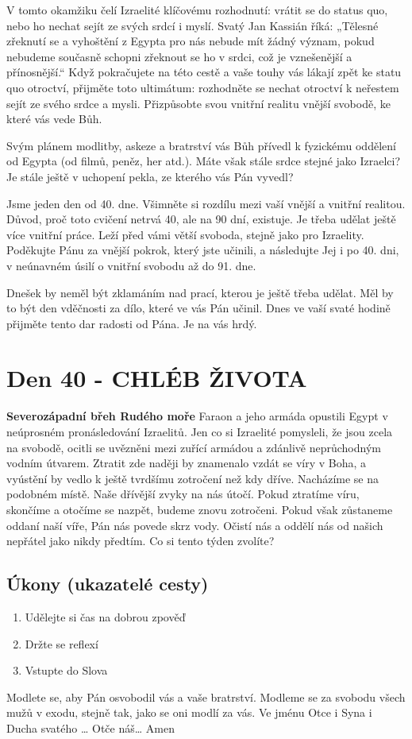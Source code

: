 \documentclass[11pt]{article}
\newcommand{\zacatekSestyTyden}{
  \textbf{Severozápadní břeh Rudého moře} \newline 
  Faraon a jeho armáda opustili Egypt v neúprosném pronásledování Izraelitů. Jen co si Izraelité pomysleli, že jsou zcela na svobodě, ocitli se uvězněni mezi zuřící armádou a zdánlivě neprůchodným vodním útvarem. Ztratit zde naději by znamenalo vzdát se víry v Boha, a vyústění by vedlo k ještě tvrdšímu zotročení než kdy dříve. Nacházíme se na podobném místě. Naše dřívější zvyky na nás útočí. Pokud ztratíme víru, skončíme a otočíme se nazpět, budeme znovu zotročeni. Pokud však zůstaneme oddaní naší víře, Pán nás povede skrz vody. Očistí nás a oddělí nás od našich nepřátel jako nikdy předtím. Co si tento týden zvolíte?

\subsection*{Úkony (ukazatelé cesty)}
\begin{enumerate}
  \item Udělejte si čas na dobrou zpověď
  \item Držte se reflexí
  \item Vstupte do Slova
\end{enumerate}
Modlete se, aby Pán osvobodil vás a vaše bratrství. \newline
Modleme se za svobodu všech mužů v exodu, stejně tak, jako se oni modlí za vás.\newline
Ve jménu Otce i Syna i Ducha svatého …  Otče náš… Amen
}
\begin{document}
V tomto okamžiku čelí Izraelité klíčovému rozhodnutí: vrátit se do status quo, nebo ho nechat sejít ze svých srdcí i
myslí. Svatý Jan Kassián říká: „Tělesné zřeknutí se a vyhoštění z Egypta pro nás nebude mít žádný význam, pokud
nebudeme současně schopni zřeknout se ho v srdci, což je vznešenější a přínosnější.“ Když pokračujete na této cestě a
vaše touhy vás lákají zpět ke statu quo otroctví, přijměte toto ultimátum: rozhodněte se nechat otroctví k neřestem sejít
ze svého srdce a mysli. Přizpůsobte svou vnitřní realitu vnější svobodě, ke které vás vede Bůh.

Svým plánem modlitby, askeze a bratrství vás Bůh přívedl k fyzickému oddělení od Egypta (od filmů, peněz, her atd.).
Máte však stále srdce stejné jako Izraelci? Je stále ještě v uchopení pekla, ze kterého vás Pán vyvedl?

Jsme jeden den od 40. dne. Všimněte si rozdílu mezi vaší vnější a vnitřní realitou. Důvod, proč toto cvičení netrvá 40,
ale na 90 dní, existuje. Je třeba udělat ještě více vnitřní práce. Leží před vámi větší svoboda, stejně jako pro Izraelity.
Poděkujte Pánu za vnější pokrok, který jste učinili, a následujte Jej i po 40. dni, v neúnavném úsilí o vnitřní svobodu až
do 91. dne.

Dnešek by neměl být zklamáním nad prací, kterou je ještě třeba udělat. Měl by to být den vděčnosti za dílo, které ve
vás Pán učinil. Dnes ve vaší svaté hodině přijměte tento dar radosti od Pána. Je na vás hrdý.



\newpage
\section{Den 40 - CHLÉB ŽIVOTA}
\zacatekSestyTyden
\end{document}
